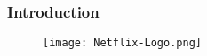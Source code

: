 \begin{frame}

    \frametitle{Introduction}

    \begin{figure}
        \centering
        \texttt{[image: Netflix-Logo.png]}
    \end{figure}

\end{frame}

